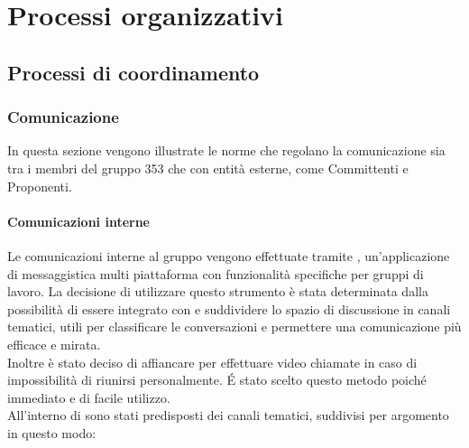 \documentclass[NormeDiProgetto.tex]{subfiles}
\begin{document}
	\chapter{Processi organizzativi}

	\section{Processi di coordinamento}
	
	\subsection{Comunicazione}
	In questa sezione vengono illustrate le norme che regolano la comunicazione sia tra i membri del gruppo 353 che con entità esterne, come Committenti e Proponenti.
	\subsubsection{Comunicazioni interne}
	Le comunicazioni interne al gruppo vengono effettuate tramite , un'applicazione di messaggistica multi piattaforma con funzionalità specifiche per gruppi di lavoro. La decisione di utilizzare questo strumento è stata determinata dalla possibilità di essere integrato con  e suddividere lo spazio di discussione in canali tematici, utili per classificare le conversazioni e permettere una comunicazione più efficace e mirata.\\
	Inoltre è stato deciso di affiancare  per effettuare video chiamate in caso di impossibilità di riunirsi personalmente. \'{E} stato scelto questo metodo poiché immediato e di facile utilizzo.\\
	All'interno di  sono stati predisposti dei canali tematici, suddivisi per argomento in questo modo:
\end{document}
